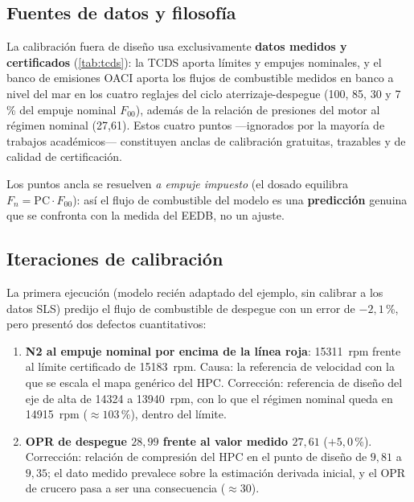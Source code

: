 \subsection{Fuentes de datos y filosofía}

La calibración fuera de diseño usa exclusivamente \textbf{datos medidos y certificados}
(\cref{tab:tcds}): la TCDS aporta límites y empujes nominales, y el banco de emisiones OACI
aporta los flujos de combustible medidos en banco a nivel del mar en los cuatro reglajes del
ciclo aterrizaje-despegue (100, 85, 30 y 7\,\% del empuje nominal $F_{00}$), además de la
relación de presiones del motor al régimen nominal (27{,}61). Estos cuatro puntos ---ignorados
por la mayoría de trabajos académicos--- constituyen anclas de calibración gratuitas, trazables
y de calidad de certificación.

Los puntos ancla se resuelven \emph{a empuje impuesto} (el dosado equilibra
$F_n = \mathrm{PC}\cdot F_{00}$): así el flujo de combustible del modelo es una
\textbf{predicción} genuina que se confronta con la medida del EEDB, no un ajuste.

\subsection{Iteraciones de calibración}

La primera ejecución (modelo recién adaptado del ejemplo, sin calibrar a los datos SLS) predijo
el flujo de combustible de despegue con un error de $-2{,}1$\,\%, pero presentó dos defectos
cuantitativos:

\begin{enumerate}
  \item \textbf{N2 al empuje nominal por encima de la línea roja}: \SI{15311}{rpm} frente al
    límite certificado de \SI{15183}{rpm}. Causa: la referencia de velocidad con la que se
    escala el mapa genérico del HPC. Corrección: referencia de diseño del eje de alta de
    \SI{14324}{} a \SI{13940}{rpm}, con lo que el régimen nominal queda en \SI{14915}{rpm}
    ($\approx103$\,\%), dentro del límite.
  \item \textbf{OPR de despegue $28{,}99$ frente al valor medido $27{,}61$} ($+5{,}0$\,\%).
    Corrección: relación de compresión del HPC en el punto de diseño de $9{,}81$ a $9{,}35$; el
    dato medido prevalece sobre la estimación derivada inicial, y el OPR de crucero pasa a ser
    una consecuencia ($\approx30$).
\end{enumerate}

\begin{table}[htbp]
  \centering\small
  \caption{Anclas SLS frente a las medidas del banco OACI tras la calibración. $W_f$~mod.\ es la
  predicción del modelo a empuje impuesto. Tabla autogenerada.}
  \label{tab:anclas}
  
\end{table}

